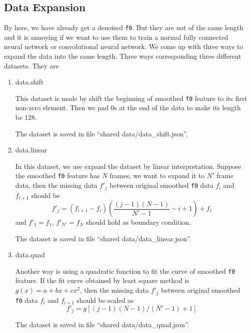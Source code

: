 \documentclass[a4paper]{article}
\begin{document}
\subsection{Data Expansion}
By here, we have already get a denoised \texttt{f0}. But they are not of the same length and it is annoying if we want to use them to train a normal fully connected neural network or convolutional neural network. We come up with three ways to expand the data into the same length. Three ways corresponding three different datasets. They are
\begin{enumerate}
\item data.shift

	This dataset is made by shift the beginning of smoothed \texttt{f0} feature to its first non-zero element. Then we pad $0$s at the end of the data to make its length be $128$.

	The dataset is saved in file ``shared data/data\_shift.json''.
\item data.linear

	In this dataset, we use expand the dataset by linear interpretation. Suppose the smoothed \texttt{f0} feature has $N$ frames, we want to expand it to $N'$ frame data, then the missing data $f'_j$ between original smoothed \texttt{f0} data $f_{i}$ and $f_{i+1}$ should be
	\[ f'_{j} =  (f_{i+1} - f_{i})\left(\frac{(j - 1)(N - 1)}{N' - 1}- i + 1\right) + f_i\]
	and $f'_{1} = f_1$, $f'_{N'} = f_{N}$ should hold as boundary condition.

	The dataset is saved in file ``shared data/data\_linear.json''.

\item data.quad
	
	Another way is using a quadratic function to fit the curve of smoothed \texttt{f0} feature. If the fit curve obtained by least square method is $g(x) = a + bx + cx^2$, then the missing data $f'_j$ between original smoothed \texttt{f0} data $f_{i}$ and $f_{i+1}$ should be scaled as
\[ f'_{j} =  g[(j - 1) (N - 1) / (N' - 1)  + 1]\]

	The dataset is saved in file ``shared data/data\_quad.json''.

\end{enumerate}
\end{document}
